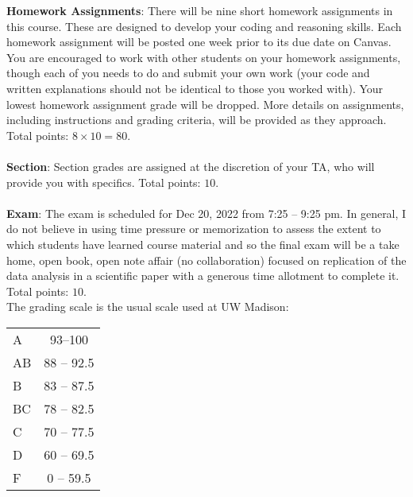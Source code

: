\documentclass[12pt]{article}
\begin{document}
\noindent \textbf{Homework Assignments}: There will be nine short homework assignments in this course. These are designed to develop your coding and reasoning skills.  Each homework assignment will be posted one week prior to its due date on Canvas.  You are encouraged to work with other students on your homework assignments, though each of you needs to do and submit your own work (your code and written explanations should not be identical to those you worked with).  Your lowest homework assignment grade will be dropped.  More details on assignments, including instructions and grading criteria, will be provided as they approach.  Total points: $8\times 10 = 80$.\\
\\
\noindent \textbf{Section}: Section grades are assigned at the discretion of your TA, who will provide you with specifics.  Total points: $10$.\\
\\
\noindent \textbf{Exam}: The exam is scheduled for Dec 20, 2022 from 7:25 -- 9:25 pm.  In general, I do not believe in using time pressure or memorization to assess the extent to which students have learned course material and so the final exam will be a take home, open book, open note affair (no collaboration) focused on replication of the data analysis in a scientific paper with a generous time allotment to complete it.  Total points: $10$.\\

The grading scale is the usual scale used at UW Madison:\\
\begin{center}
\begin{tabular*}{1.25in}{lc}
\hline
\hline
A& 93--100\\
AB& 88 -- 92.5\\
B&83 -- 87.5\\
BC&78 -- 82.5\\
C&70 -- 77.5\\
D&60 -- 69.5\\
F&0 -- 59.5\\
\hline
\hline
\end{tabular*}
\end{center}
\end{document}
